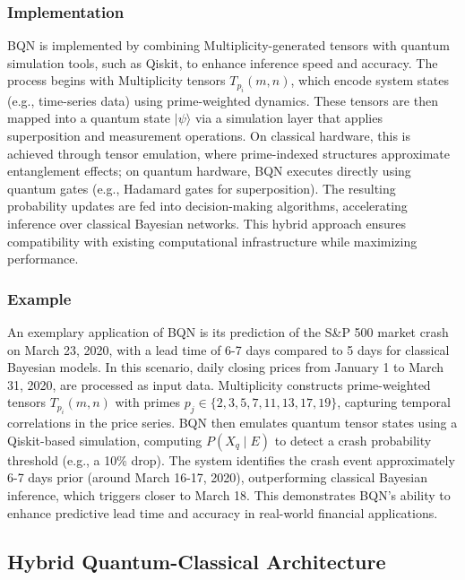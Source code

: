 \documentclass[12pt]{article}
\begin{document}
\subsubsection{Implementation}
BQN is implemented by combining Multiplicity-generated tensors with quantum simulation tools, such as Qiskit, to enhance inference speed and accuracy. The process begins with Multiplicity tensors \( T_{p_i}(m, n) \), which encode system states (e.g., time-series data) using prime-weighted dynamics. These tensors are then mapped into a quantum state \( |\psi\rangle \) via a simulation layer that applies superposition and measurement operations. On classical hardware, this is achieved through tensor emulation, where prime-indexed structures approximate entanglement effects; on quantum hardware, BQN executes directly using quantum gates (e.g., Hadamard gates for superposition). The resulting probability updates are fed into decision-making algorithms, accelerating inference over classical Bayesian networks. This hybrid approach ensures compatibility with existing computational infrastructure while maximizing performance.

\subsubsection{Example}
An exemplary application of BQN is its prediction of the S\&P 500 market crash on March 23, 2020, with a lead time of 6-7 days compared to 5 days for classical Bayesian models. In this scenario, daily closing prices from January 1 to March 31, 2020, are processed as input data. Multiplicity constructs prime-weighted tensors \( T_{p_i}(m, n) \) with primes \( p_j \in \{2, 3, 5, 7, 11, 13, 17, 19\} \), capturing temporal correlations in the price series. BQN then emulates quantum tensor states using a Qiskit-based simulation, computing \( P(X_q \mid E) \) to detect a crash probability threshold (e.g., a 10\% drop). The system identifies the crash event approximately 6-7 days prior (around March 16-17, 2020), outperforming classical Bayesian inference, which triggers closer to March 18. This demonstrates BQN’s ability to enhance predictive lead time and accuracy in real-world financial applications.

\subsection{Hybrid Quantum-Classical Architecture}
\end{document}

